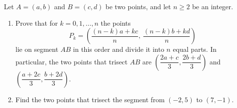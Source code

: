 Let $A=(a,b)$ and $B=(c,d)$ be two points, and let $n\ge2$ be an integer.
\begin{enumerate}
\item[(a)] Prove that for $k=0,1,\dots,n$ the points
\[P_k=\left(\dfrac{(n-k)a+kc}{n},\ \dfrac{(n-k)b+kd}{n}\right)\]
lie on segment $AB$ in this order and divide it into $n$ equal parts. In particular, the two points that trisect $AB$ are $\left(\dfrac{2a+c}{3},\dfrac{2b+d}{3}\right)$ and $\left(\dfrac{a+2c}{3},\dfrac{b+2d}{3}\right)$.
\item[(b)] Find the two points that trisect the segment from $(-2,5)$ to $(7,-1)$.
\end{enumerate}
